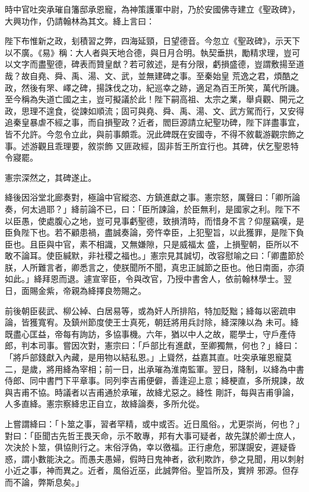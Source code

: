 \begin{pinyinscope}
 時中官吐突承璀自籓邸承恩寵，為神策護軍中尉，乃於安國佛寺建立《聖政碑》，大興功作，仍請翰林為其文。絳上言曰：



 陛下布惟新之政，刬積習之弊，四海延頸，日望德音。今忽立《聖政碑》，示天下以不廣。《易》稱：大人者與天地合德，與日月合明。執契垂拱，勵精求理，豈可以文字而盡聖德，碑表而贊皇猷？若可敘述，是有分限，虧損盛德，豈謂敷揚至道哉？故自堯、舜、禹、湯、文、武，並無建碑之事。至秦始皇
 荒逸之君，煩酷之政，然後有罘、嶧之碑，揚誅伐之功，紀巡幸之跡，適足為百王所笑，萬代所譏。至今稱為失道亡國之主，豈可擬議於此！陛下嗣高祖、太宗之業，舉貞觀、開元之政，思理不遑食，從諫如順流；固可與堯、舜、禹、湯、文、武方駕而行，又安得追秦皇暴虐不經之事，而自損聖政？近者，閻巨源請立紀聖功碑，陛下詳盡事宜，皆不允許。今忽令立此，與前事頗乖。況此碑既在安國寺，不得不敘載游觀宗飾之事。述游觀且乖理要，敘崇飾
 又匪政經，固非哲王所宜行也。其碑，伏乞聖恩特令寢罷。



 憲宗深然之，其碑遂止。



 絳後因浴堂北廊奏對，極論中官縱恣、方鎮進獻之事。憲宗怒，厲聲曰：「卿所論奏，何太過耶？」絳前論不已，曰：「臣所諫論，於臣無利，是國家之利。陛下不以臣愚，使處腹心之地，豈可見事虧聖德，致損清時，而惜身不言？仰屋竊嘆，是臣負陛下也。若不顧患禍，盡誠奏論，旁忤幸臣，上犯聖旨，以此獲罪，是陛下負臣也。且臣與中官，素不相識，又無嫌隙，只是威福太
 盛，上損聖朝，臣所以不敢不論耳。使臣緘默，非社稷之福也。」憲宗見其誠切，改容慰喻之曰：「卿盡節於朕，人所難言者，卿悉言之，使朕聞所不聞，真忠正誠節之臣也。他日南面，亦須如此。」絳拜恩而退。遽宣宰臣，令與改官，乃授中書舍人，依前翰林學士。翌日，面賜金紫，帝親為絳擇良笏賜之。



 前後朝臣裴武、柳公綽、白居易等，或為奸人所排陷，特加貶黜；絳每以密疏申論，皆獲寬宥。及鎮州節度使王士真死，朝廷將用兵討除，絳深陳以為
 未可。絳既盡心匡益，帝每有詢訪，多協事機。六年，猶以中人之故，罷學士，守戶產侍郎，判本司事。嘗因次對，憲宗曰：「戶部比有進獻，至卿獨無，何也？」絳曰：「將戶部錢獻入內藏，是用物以結私恩。」上聳然，益嘉其直。吐突承璀恩寵莫二，是歲，將用絳為宰相；前一日，出承璀為淮南監軍。翌日，降制，以絳為中書侍郎、同中書門下平章事。同列李吉甫便僻，善逢迎上意；絳梗直，多所規諫，故與吉甫不協。時議者以吉甫通於承璀，故絳尤惡之。絳性
 剛訐，每與吉甫爭論，人多直絳。憲宗察絳忠正自立，故絳論奏，多所允從。



 上嘗謂絳曰：「卜筮之事，習者罕精，或中或否。近日風俗。，尤更崇尚，何也？」對曰：「臣聞古先哲王畏天命，示不敢專，邦有大事可疑者，故先謀於卿士庶人，次決於卜筮，俱協則行之。末俗浮偽，幸以徼福。正行慮危，邪謀覬安，遲疑昏惑，謂小數能決之。而愚夫愚婦，假時日鬼神者，欲利欺詐，參之見聞，用以刺射小近之事，神而異之。近者，風俗近巫，此誠弊俗。聖旨所及，實辨
 邪源。但存而不論，弊斯息矣。」




\end{pinyinscope}
